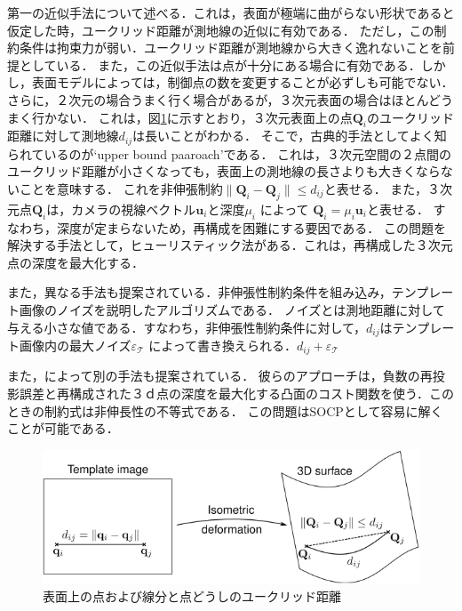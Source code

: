 \documentclass[10.5pt,twocolumn,a4j,fleqn]{ujarticle}
\def\figref#1{図\ref{#1}}
\begin{document}
第一の近似手法について述べる．これは，表面が極端に曲がらない形状であると仮定した時，ユークリッド距離が測地線の近似に有効である．
ただし，この制約条件は拘束力が弱い．ユークリッド距離が測地線から大きく逸れないことを前提としている．
また，この近似手法は点が十分にある場合に有効である．しかし，表面モデルによっては，制御点の数を変更することが必ずしも可能でない．
さらに，２次元の場合うまく行く場合があるが，３次元表面の場合はほとんどうまく行かない．
これは，\figref{fig1}に示すとおり，３次元表面上の点$\bm{Q}_i$のユークリッド距離に対して測地線$d_{ij}$は長いことがわかる．
そこで，古典的手法としてよく知られているのが`upper bound paaroach'である．
これは，３次元空間の２点間のユークリッド距離が小さくなっても，表面上の測地線の長さよりも大きくならないことを意味する．
これを非伸張制約$\| \bm{Q}_i -\bm{Q}_j\| \le d_{ij}$と表せる．
また，３次元点$\bm{Q}_i$は，カメラの視線ベクトル$\mathrm{\bm{u}}_i$と深度$\mu_i$ によって $\bm{Q}_i =\mu_i \mathrm{\bm{u}}_i$と表せる．
すなわち，深度が定まらないため，再構成を困難にする要因である．
この問題を解決する手法として，ヒューリスティック法がある．これは，再構成した３次元点の深度を最大化する．

また，異なる手法も提案されている\cite{Perriollat2011a}．非伸張性制約条件を組み込み，テンプレート画像のノイズを説明したアルゴリズムである．
ノイズとは測地距離に対して与える小さな値である．すなわち，非伸張性制約条件に対して，$d_{ij}$はテンプレート画像内の最大ノイズ$\varepsilon_{\mathcal{T}}$
によって書き換えられる．$d_{ij} + \varepsilon_{\mathcal{T}}$

また，\cite{Salzmann2009}によって別の手法も提案されている．
彼らのアプローチは，負数の再投影誤差と再構成された３ｄ点の深度を最大化する凸面のコスト関数を使う．このときの制約式は非伸長性の不等式である．
この問題はSOCPとして容易に解くことが可能である．

\begin{figure}[htbp]
 \begin{center}
  \includegraphics[width=150mm]{img/fig1.png}
  \caption{表面上の点および線分と点どうしのユークリッド距離}
  \label{fig1}
 \end{center}
\end{figure}
\end{document}
